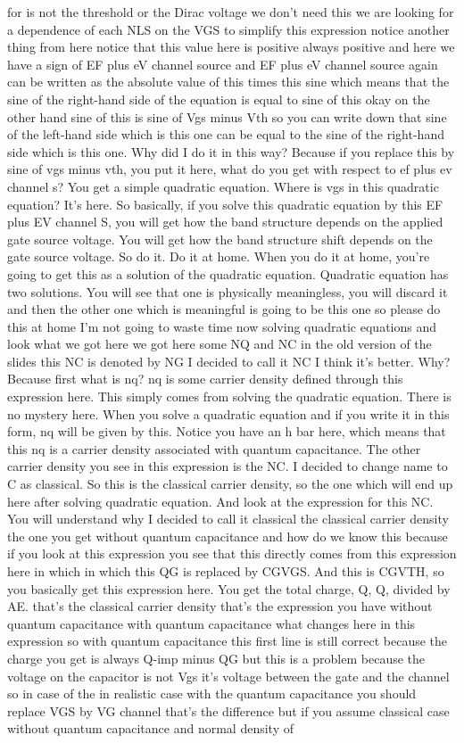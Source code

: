 for is not the threshold or the Dirac voltage we don't need this we are looking for a dependence of each NLS on the VGS to simplify this expression notice another thing from here notice that this value here is positive always positive and here we have a sign of EF plus eV channel source and EF plus eV channel source again can be written as the absolute value of this times this sine which means that the sine of the right-hand side of the equation is equal to sine of this okay on the other hand sine of this is sine of Vgs minus Vth so you can write down that sine of the left-hand side which is this one can be equal to the sine of the right-hand side which is this one. Why did I do it in this way? Because if you replace this by sine of vgs minus vth, you put it here, what do you get with respect to ef plus ev channel s? You get a simple quadratic equation. Where is vgs in this quadratic equation? It's here. So basically, if you solve this quadratic equation by this EF plus EV channel S, you will get how the band structure depends on the applied gate source voltage. You will get how the band structure shift depends on the gate source voltage. So do it. Do it at home. When you do it at home, you're going to get this as a solution of the quadratic equation. Quadratic equation has two solutions. You will see that one is physically meaningless, you will discard it and then the other one which is meaningful is going to be this one so please do this at home I'm not going to waste time now solving quadratic equations and look what we got here we got here some NQ and NC in the old version of the slides this NC is denoted by NG I decided to call it NC I think it's better. Why? Because first what is nq? nq is some carrier density defined through this expression here. This simply comes from solving the quadratic equation. There is no mystery here. When you solve a quadratic equation and if you write it in this form, nq will be given by this. Notice you have an h bar here, which means that this nq is a carrier density associated with quantum capacitance. The other carrier density you see in this expression is the NC. I decided to change name to C as classical. So this is the classical carrier density, so the one which will end up here after solving quadratic equation. And look at the expression for this NC. You will understand why I decided to call it classical the classical carrier density the one you get without quantum capacitance and how do we know this because if you look at this expression you see that this directly comes from this expression here in which in which this QG is replaced by CGVGS. And this is CGVTH, so you basically get this expression here. You get the total charge, Q, Q, divided by AE. that's the classical carrier density that's the expression you have without quantum capacitance with quantum capacitance what changes here in this expression so with quantum capacitance this first line is still correct because the charge you get is always Q-imp minus QG but this is a problem because the voltage on the capacitor is not Vgs it's voltage between the gate and the channel so in case of the in realistic case with the quantum capacitance you should replace VGS by VG channel that's the difference but if you assume classical case without quantum capacitance and normal density of 